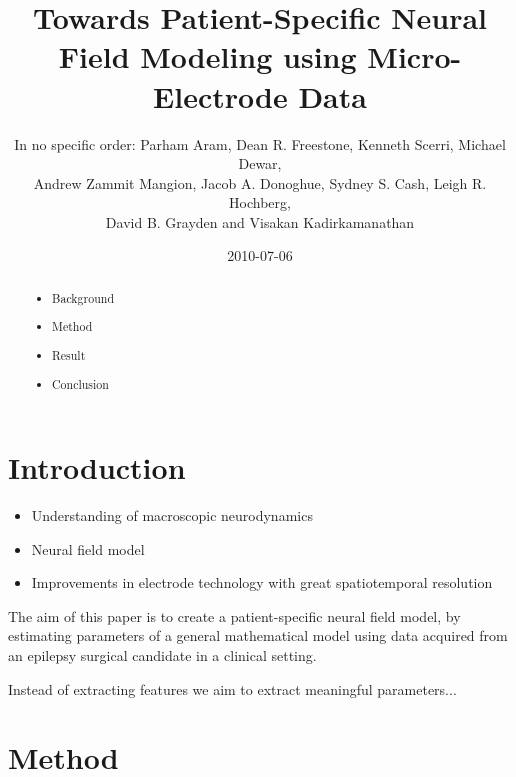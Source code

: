 \documentclass[]{article}
\title{Towards Patient-Specific Neural Field Modeling using Micro-Electrode Data}
\author{In no specific order: Parham Aram, Dean R. Freestone, Kenneth Scerri, Michael Dewar,\\
 Andrew Zammit Mangion, Jacob A. Donoghue, Sydney S. Cash, Leigh R. Hochberg,\\
 David B. Grayden and Visakan Kadirkamanathan  }
\date{2010-07-06}
\begin{document}
\ifpdf
{}
\else
{}
\fi

\maketitle


\begin{abstract}
	
	\begin{itemize}
		\item Background
		\item Method
		\item Result
		\item Conclusion
	\end{itemize}
\end{abstract}

\section{Introduction}
\begin{itemize}
	\item Understanding of macroscopic neurodynamics
	\item Neural field model
	\item Improvements in electrode technology with great spatiotemporal resolution
\end{itemize}
The aim of this paper is to create a patient-specific neural field model, by estimating parameters of a general mathematical model using data acquired from an epilepsy surgical candidate in a clinical setting. 

Instead of extracting features we aim to extract meaningful parameters...

\section{Method}
\end{document}
